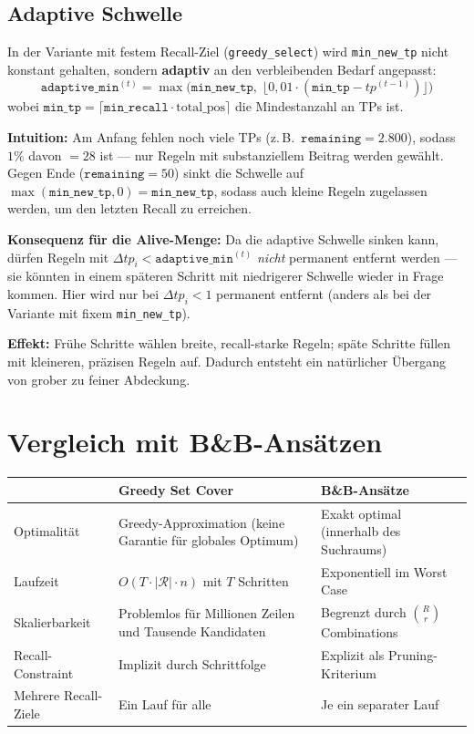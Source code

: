 \documentclass[11pt,a4paper]{article}
\begin{document}
\subsection{Adaptive Schwelle}

In der Variante mit festem Recall-Ziel (\texttt{greedy\_select}) wird \texttt{min\_new\_tp} nicht konstant gehalten, sondern \textbf{adaptiv} an den verbleibenden Bedarf angepasst:
\[
  \texttt{adaptive\_min}^{(t)} = \max\!\Big(\texttt{min\_new\_tp},\;\big\lfloor 0{,}01 \cdot (\texttt{min\_tp} - \mathit{tp}^{(t-1)})\big\rfloor\Big)
\]
wobei $\texttt{min\_tp} = \lceil \texttt{min\_recall} \cdot \text{total\_pos} \rceil$ die Mindestanzahl an TPs ist.

\medskip
\noindent\textbf{Intuition:} Am Anfang fehlen noch viele TPs (z.\,B.\ $\texttt{remaining} = 2{.}800$), sodass $1\%$ davon $= 28$ ist --- nur Regeln mit substanziellem Beitrag werden gew\"ahlt. Gegen Ende ($\texttt{remaining} = 50$) sinkt die Schwelle auf $\max(\texttt{min\_new\_tp}, 0) = \texttt{min\_new\_tp}$, sodass auch kleine Regeln zugelassen werden, um den letzten Recall zu erreichen.

\medskip
\noindent\textbf{Konsequenz f\"ur die Alive-Menge:} Da die adaptive Schwelle sinken kann, d\"urfen Regeln mit $\Delta\mathit{tp}_i < \texttt{adaptive\_min}^{(t)}$ \emph{nicht} permanent entfernt werden --- sie k\"onnten in einem sp\"ateren Schritt mit niedrigerer Schwelle wieder in Frage kommen. Hier wird nur bei $\Delta\mathit{tp}_i < 1$ permanent entfernt (anders als bei der Variante mit fixem \texttt{min\_new\_tp}).

\medskip
\noindent\textbf{Effekt:} Fr\"uhe Schritte w\"ahlen breite, recall-starke Regeln; sp\"ate Schritte f\"ullen mit kleineren, pr\"azisen Regeln auf. Dadurch entsteht ein nat\"urlicher \"Ubergang von grober zu feiner Abdeckung.

\section{Vergleich mit B\&B-Ans\"atzen}

\begin{center}
\renewcommand{\arraystretch}{1.4}
\begin{tabular}{p{3.5cm}p{5.5cm}p{5.5cm}}
\toprule
& \textbf{Greedy Set Cover} & \textbf{B\&B-Ans\"atze} \\
\midrule
Optimalit\"at & Greedy-Approximation (keine Garantie f\"ur globales Optimum) & Exakt optimal (innerhalb des Suchraums) \\
Laufzeit & $O(T \cdot |\mathcal{R}| \cdot n)$ mit $T$ Schritten & Exponentiell im Worst Case \\
Skalierbarkeit & Problemlos f\"ur Millionen Zeilen und Tausende Kandidaten & Begrenzt durch $\binom{R}{r}$ Combinations \\
Recall-Constraint & Implizit durch Schrittfolge & Explizit als Pruning-Kriterium \\
Mehrere Recall-Ziele & Ein Lauf f\"ur alle & Je ein separater Lauf \\
\bottomrule
\end{tabular}
\end{center}
\end{document}
